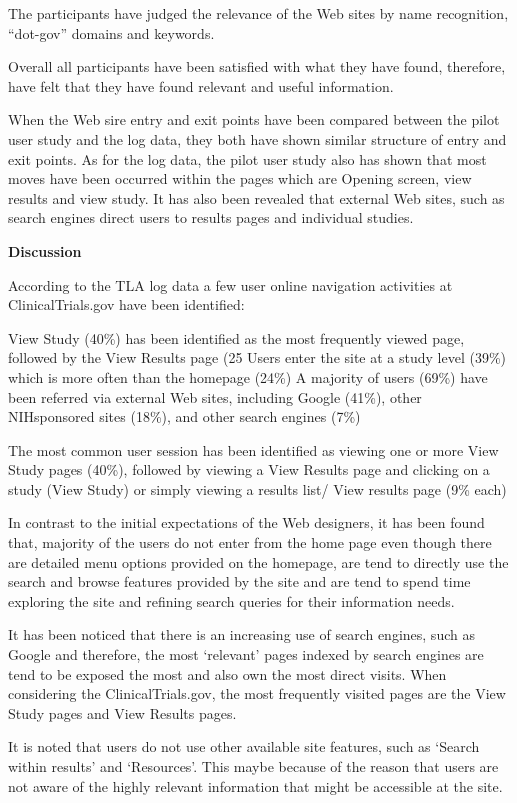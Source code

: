 \documentclass[]{article}
\begin{document}
The participants have judged the relevance of the Web sites by name recognition, “dot-gov” domains and keywords.   

Overall all participants have been satisfied with what they have found, therefore, have felt that they have found relevant and useful information.  
 
When the Web sire entry and exit points have been compared between the pilot user study and the log data, they both have shown similar structure of entry and exit points. As for the log data, the pilot user study also has shown that most moves have been occurred within the pages which are Opening screen, view results and view study. It has also been revealed that external Web sites, such as search engines direct users to results pages and individual studies. 

\textbf{Discussion}

According to the TLA log data a few user online navigation activities at ClinicalTrials.gov have been identified:

View Study (40\%) has been identified as the most frequently viewed page, followed by the View Results page (25%
Users enter the site at a study level (39\%) which is more often than the homepage (24\%)
A majority of users (69\%) have been referred via external Web sites, including Google (41\%), other NIHsponsored sites (18\%), and other search engines (7\%)

The most common user session has been identified as viewing one or more View Study pages (40\%), followed by viewing a View Results page and clicking on a study (View Study) or simply viewing a results list/ View results page (9\% each)

In contrast to the initial expectations of the Web designers, it has been found that, majority of the users do not enter from the home page even though there are detailed menu options provided on the homepage, are tend to directly use the search and browse features provided by the site and are tend to spend time exploring the site and refining search queries for their information needs. 

It has been noticed that there is an increasing use of search engines, such as Google and therefore, the most ‘relevant’ pages indexed by search engines are tend to be exposed the most and also own the most direct visits. When considering the ClinicalTrials.gov, the most frequently visited pages are the View Study pages and View Results pages.  

It is noted that users do not use other available site features, such as ‘Search within results’ and ‘Resources’. This maybe because of the reason that users are not aware of the highly relevant information that might be accessible at the site.
\end{document}
